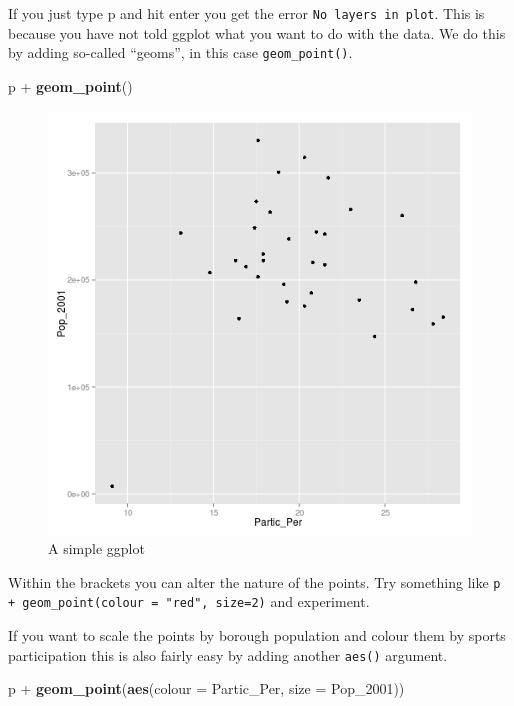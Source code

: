 \documentclass[]{article}
\newenvironment{Shaded}{}{}
\newcommand{\KeywordTok}[1]{\textcolor[rgb]{0.00,0.44,0.13}{\textbf{{#1}}}}
\newcommand{\DataTypeTok}[1]{\textcolor[rgb]{0.56,0.13,0.00}{{#1}}}
\newcommand{\StringTok}[1]{\textcolor[rgb]{0.25,0.44,0.63}{{#1}}}
\newcommand{\NormalTok}[1]{{#1}}
\begin{document}
If you just type p and hit enter you get the error
\texttt{No layers in plot}. This is because you have not told ggplot
what you want to do with the data. We do this by adding so-called
``geoms'', in this case \texttt{geom\_point()}.

\begin{Shaded}
\begin{Highlighting}[]
\NormalTok{p +}\StringTok{ }\KeywordTok{geom_point}\NormalTok{()}
\end{Highlighting}
\end{Shaded}

\begin{figure}[htbp]
\centering
\includegraphics{figure/A_simple_ggplot.png}
\caption{A simple ggplot}
\end{figure}

Within the brackets you can alter the nature of the points. Try
something like \texttt{p + geom\_point(colour = "red", size=2)} and
experiment.

If you want to scale the points by borough population and colour them by
sports participation this is also fairly easy by adding another
\texttt{aes()} argument.

\begin{Shaded}
\begin{Highlighting}[]
\NormalTok{p +}\StringTok{ }\KeywordTok{geom_point}\NormalTok{(}\KeywordTok{aes}\NormalTok{(}\DataTypeTok{colour =} \NormalTok{Partic_Per, }\DataTypeTok{size =} \NormalTok{Pop_2001))}
\end{Highlighting}
\end{Shaded}
\end{document}
